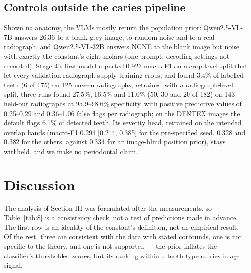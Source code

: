 \documentclass[conference]{IEEEtran}
\begin{document}
\subsection{Controls outside the caries pipeline}

Shown no anatomy, the VLMs mostly return the population prior: Qwen2.5-VL-7B answers 26,36 to a blank grey image, to random noise and to a real radiograph, and Qwen2.5-VL-32B answers NONE to the blank image but noise with exactly the constant's eight molars (one prompt; decoding settings not recorded). Stage 4's first model reported 0.923 macro-F1 on a crop-level split that let every validation radiograph supply training crops, and found 3.4\% of labelled teeth (6 of 175) on 125 unseen radiographs; retrained with a radiograph-level split, three runs found 27.5\%, 16.5\% and 11.0\% (50, 30 and 20 of 182) on 143 held-out radiographs at 95.9–98.6\% specificity, with positive predictive values of 0.25–0.29 and 0.36–1.06 false flags per radiograph; on the DENTEX images the default flags 6.1\% of detected teeth. Its severity head, retrained on the intended overlap bands (macro-F1 0.294 [0.214, 0.385] for the pre-specified seed, 0.328 and 0.382 for the others, against 0.334 for an image-blind position prior), stays withheld, and we make no periodontal claim.

\section{Discussion}

The analysis of Section III was formulated after the measurements, so Table~\ref{tab:8} is a consistency check, not a test of predictions made in advance. The first row is an identity of the constant's definition, not an empirical result. Of the rest, three are consistent with the data with stated confounds, one is not specific to the theory, and one is not supported — the prior inflates the classifier's thresholded scores, but its ranking within a tooth type carries image signal.
\end{document}
